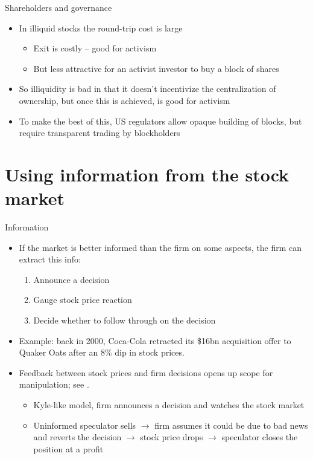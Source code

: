 \documentclass[english,10pt
,aspectratio=169
]{beamer}
\begin{document}
\begin{frame}{Shareholders and governance}
	\begin{itemize}
		\item In illiquid stocks the round-trip cost is large
		\begin{itemize}
			\item Exit is costly -- good for activism
			\item But less attractive for an activist investor to buy a block of shares
		\end{itemize}
		\item So illiquidity is bad in that it doesn't incentivize the centralization of ownership, but once this is achieved, is good for activism
		\item To make the best of this, US regulators allow opaque building of blocks, but require transparent trading by blockholders
	\end{itemize}
\end{frame}


\section{Using information from the stock market}

\begin{frame}{Information}
	\begin{itemize}
		\item If the market is better informed than the firm on some aspects, the firm can extract this info:
		\begin{enumerate}
			\item Announce a decision
			\item Gauge stock price reaction
			\item Decide whether to follow through on the decision
		\end{enumerate}
		\pause[3]
		\item Example: back in 2000, Coca-Cola retracted its \$16bn acquisition offer to Quaker Oats after an 8\% dip in stock prices.
		\item Feedback between stock prices and firm decisions opens up scope for manipulation; see \cite{goldstein_manipulation_2008}.
		\begin{itemize}
			\item Kyle-like model, firm announces a decision and watches the stock market
			\item Uninformed speculator sells $\to$ firm assumes it could be due to bad news and reverts the decision $\to$ stock price drops $\to$ speculator closes the position at a profit
		\end{itemize}
	\end{itemize}
\end{frame}
\end{document}

